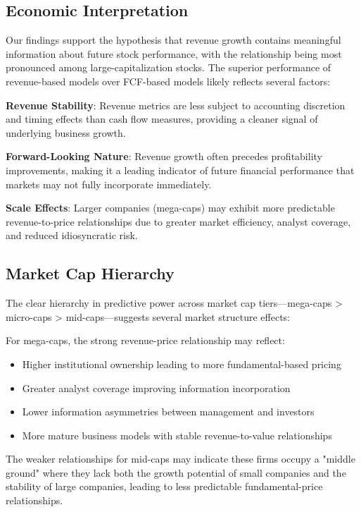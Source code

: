 \documentclass[11pt]{article}
\begin{document}
\subsection{Economic Interpretation}

Our findings support the hypothesis that revenue growth contains meaningful information about future stock performance, with the relationship being most pronounced among large-capitalization stocks. The superior performance of revenue-based models over FCF-based models likely reflects several factors:

\textbf{Revenue Stability}: Revenue metrics are less subject to accounting discretion and timing effects than cash flow measures, providing a cleaner signal of underlying business growth.

\textbf{Forward-Looking Nature}: Revenue growth often precedes profitability improvements, making it a leading indicator of future financial performance that markets may not fully incorporate immediately.

\textbf{Scale Effects}: Larger companies (mega-caps) may exhibit more predictable revenue-to-price relationships due to greater market efficiency, analyst coverage, and reduced idiosyncratic risk.

\subsection{Market Cap Hierarchy}

The clear hierarchy in predictive power across market cap tiers—mega-caps > micro-caps > mid-caps—suggests several market structure effects:

For mega-caps, the strong revenue-price relationship may reflect:
\begin{itemize}
\item Higher institutional ownership leading to more fundamental-based pricing
\item Greater analyst coverage improving information incorporation
\item Lower information asymmetries between management and investors
\item More mature business models with stable revenue-to-value relationships
\end{itemize}

The weaker relationships for mid-caps may indicate these firms occupy a "middle ground" where they lack both the growth potential of small companies and the stability of large companies, leading to less predictable fundamental-price relationships.
\end{document}
